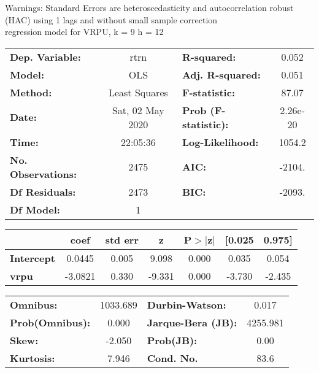Warnings: \newline
 [1] Standard Errors are heteroscedasticity and autocorrelation robust (HAC) using 1 lags and without small sample correction\\ 

regression model for VRPU, k = 9 h = 12\begin{center}
\begin{tabular}{lclc}
\toprule
\textbf{Dep. Variable:}    &       rtrn       & \textbf{  R-squared:         } &     0.052   \\
\textbf{Model:}            &       OLS        & \textbf{  Adj. R-squared:    } &     0.051   \\
\textbf{Method:}           &  Least Squares   & \textbf{  F-statistic:       } &     87.07   \\
\textbf{Date:}             & Sat, 02 May 2020 & \textbf{  Prob (F-statistic):} &  2.26e-20   \\
\textbf{Time:}             &     22:05:36     & \textbf{  Log-Likelihood:    } &    1054.2   \\
\textbf{No. Observations:} &        2475      & \textbf{  AIC:               } &    -2104.   \\
\textbf{Df Residuals:}     &        2473      & \textbf{  BIC:               } &    -2093.   \\
\textbf{Df Model:}         &           1      & \textbf{                     } &             \\
\bottomrule
\end{tabular}
\begin{tabular}{lcccccc}
                   & \textbf{coef} & \textbf{std err} & \textbf{z} & \textbf{P$> |$z$|$} & \textbf{[0.025} & \textbf{0.975]}  \\
\midrule
\textbf{Intercept} &       0.0445  &        0.005     &     9.098  &         0.000        &        0.035    &        0.054     \\
\textbf{vrpu}      &      -3.0821  &        0.330     &    -9.331  &         0.000        &       -3.730    &       -2.435     \\
\bottomrule
\end{tabular}
\begin{tabular}{lclc}
\textbf{Omnibus:}       & 1033.689 & \textbf{  Durbin-Watson:     } &    0.017  \\
\textbf{Prob(Omnibus):} &   0.000  & \textbf{  Jarque-Bera (JB):  } & 4255.981  \\
\textbf{Skew:}          &  -2.050  & \textbf{  Prob(JB):          } &     0.00  \\
\textbf{Kurtosis:}      &   7.946  & \textbf{  Cond. No.          } &     83.6  \\
\bottomrule
\end{tabular}
\end{center}

